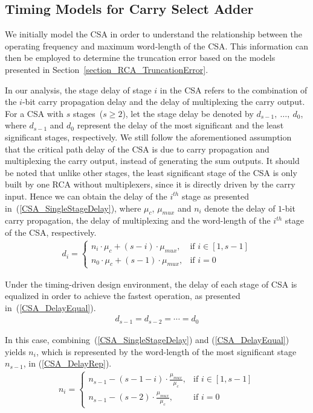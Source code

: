 \documentclass[prodmode,acmtrets]{acmsmall} %
\begin{document}
\subsection{Timing Models for Carry Select Adder}
We initially model the CSA in order to understand the relationship between the operating frequency and maximum word-length of the CSA. This information can then be employed to determine the truncation error based on the models presented in Section~\ref{section_RCA_TruncationError}.

In our analysis, the stage delay of stage $i$ in the CSA refers to the combination of the $i$-bit carry propagation delay and the delay of multiplexing the carry output. For a CSA with $s$ stages~($s\geqslant 2$), let the stage delay be denoted by $d_{s-1},~\dots,~d_{0}$, where $d_{s-1}$ and $d_{0}$ represent the delay of the most significant and the least significant stages, respectively. We still follow the aforementioned assumption that the critical path delay of the CSA is due to carry propagation and multiplexing the carry output, instead of generating the sum outputs. It should be noted that unlike other stages, the least significant stage of the CSA is only built by one RCA without multiplexers, since it is directly driven by the carry input. Hence we can obtain the delay of the $i^{th}$ stage as presented in~(\ref{CSA_SingleStageDelay}), where $\mu_{c}$, $\mu_{mux}$ and $n_i$ denote the delay of $1$-bit carry propagation, the delay of multiplexing and the word-length of the $i^{th}$ stage of the CSA, respectively.
%
\begin{eqnarray}\label{CSA_SingleStageDelay}
  d_i=\left\{
    \begin{matrix}
      n_i\cdot \mu_{c}+(s-i)\cdot\mu_{mux}, &\textrm{if $i\in\left[1,s-1\right]$}\\
      n_0\cdot \mu_c + (s-1)\cdot\mu_{mux}, & \textrm{if $i=0$}
    \end{matrix}
  \right.
\end{eqnarray}

Under the timing-driven design environment, the delay of each stage of CSA is equalized in order to achieve the fastest operation, as presented in~(\ref{CSA_DelayEqual}).
%
\begin{eqnarray}\label{CSA_DelayEqual}
  d_{s-1}=d_{s-2}=\cdots=d_{0}
\end{eqnarray}

In this case, combining~(\ref{CSA_SingleStageDelay}) and (\ref{CSA_DelayEqual}) yields $n_i$, which is represented by the word-length of the most significant stage $n_{s-1}$, in (\ref{CSA_DelayRep}).
%
\begin{eqnarray}\label{CSA_DelayRep}
 n_i=\left\{
	\begin{matrix}
	  n_{s-1}-(s-1-i)\cdot\frac{\mu_{mux}}{\mu_c}, & \textrm{if $i\in\left[1,s-1\right]$}\\
	  n_{s-1}-(s-2)\cdot\frac{\mu_{mux}}{\mu_c}, &\textrm{if $i=0$}
	\end{matrix}
    \right.
\end{eqnarray}
\end{document}
